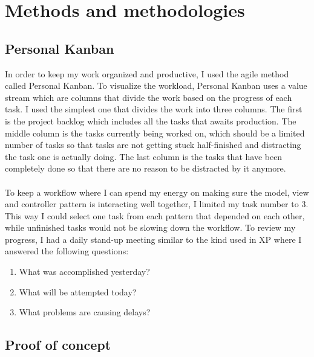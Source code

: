 
\chapter{Methods and methodologies} %

\label{Chapter3} %


\section{Personal Kanban}
In order to keep my work organized and productive, I used the agile method called Personal Kanban. To visualize the workload, Personal Kanban uses a value stream which are columns that divide the work based on the progress of each task. I used the simplest one that divides the work into three columns. The first is the project backlog which includes all the tasks that awaits production. The middle column is the tasks currently being worked on, which should be a limited number of tasks so that tasks are not getting stuck half-finished and distracting the task one is actually doing. The last column is the tasks that have been completely done so that there are no reason to be distracted by it anymore. \parencite{Reference1}
\\\\
To keep a workflow where I can spend my energy on making sure the model, view and controller pattern is interacting well together, I limited my task number to 3. This way I could select one task from each pattern that depended on each other, while unfinished tasks would not be slowing down the workflow.
To review my progress, I had a daily stand-up meeting similar to the kind used in XP \parencite{Reference2} where I answered the following questions:
\begin{enumerate}
\item What was accomplished yesterday?
\item What will be attempted today?
\item What problems are causing delays?
\end{enumerate}



\section{Proof of concept}

